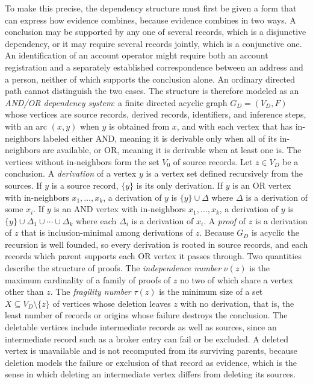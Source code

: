 \documentclass[11pt]{article}
\theoremstyle{definition}
\theoremstyle{remark}
\begin{document}
To make this precise, the dependency structure must first be given a form that can express how evidence combines, because evidence combines in two ways. A conclusion may be supported by any one of several records, which is a disjunctive dependency, or it may require several records jointly, which is a conjunctive one. An identification of an account operator might require both an account registration and a separately established correspondence between an address and a person, neither of which supports the conclusion alone. An ordinary directed path cannot distinguish the two cases. The structure is therefore modeled as an \emph{AND/OR dependency system}: a finite directed acyclic graph $G_D = (V_D, F)$ whose vertices are source records, derived records, identifiers, and inference steps, with an arc $(x,y)$ when $y$ is obtained from $x$, and with each vertex that has in-neighbors labeled either AND, meaning it is derivable only when all of its in-neighbors are available, or OR, meaning it is derivable when at least one is. The vertices without in-neighbors form the set $V_0$ of source records. Let $z \in V_D$ be a conclusion. A \emph{derivation} of a vertex $y$ is a vertex set defined recursively from the sources. If $y$ is a source record, $\{y\}$ is its only derivation. If $y$ is an OR vertex with in-neighbors $x_1, \ldots, x_k$, a derivation of $y$ is $\{y\} \cup \Delta$ where $\Delta$ is a derivation of some $x_i$. If $y$ is an AND vertex with in-neighbors $x_1, \ldots, x_k$, a derivation of $y$ is $\{y\} \cup \Delta_1 \cup \cdots \cup \Delta_k$ where each $\Delta_i$ is a derivation of $x_i$. A \emph{proof} of $z$ is a derivation of $z$ that is inclusion-minimal among derivations of $z$. Because $G_D$ is acyclic the recursion is well founded, so every derivation is rooted in source records, and each records which parent supports each OR vertex it passes through. Two quantities describe the structure of proofs. The \emph{independence number} $\nu(z)$ is the maximum cardinality of a family of proofs of $z$ no two of which share a vertex other than $z$. The \emph{fragility number} $\tau(z)$ is the minimum size of a set $X \subseteq V_D \setminus \{z\}$ of vertices whose deletion leaves $z$ with no derivation, that is, the least number of records or origins whose failure destroys the conclusion. The deletable vertices include intermediate records as well as sources, since an intermediate record such as a broker entry can fail or be excluded. A deleted vertex is unavailable and is not recomputed from its surviving parents, because deletion models the failure or exclusion of that record as evidence, which is the sense in which deleting an intermediate vertex differs from deleting its sources.
\end{document}
